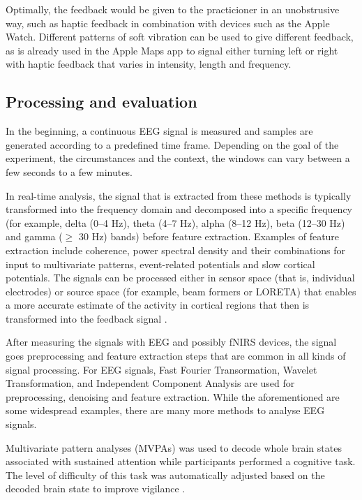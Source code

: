 \documentclass{llncs} %
\begin{document}
Optimally, the feedback would be given to the practicioner in an unobstrusive way, such as haptic feedback in combination with devices such as the Apple Watch. Different patterns of soft vibration can be used to give different feedback, as is already used in the Apple Maps app to signal either turning left or right with haptic feedback that varies in intensity, length and frequency. 

\subsection{Processing and evaluation}

In the beginning, a continuous EEG signal is measured and samples are generated according to a predefined time frame. Depending on the goal of the experiment, the circumstances and the context, the windows can vary between a few seconds to a few minutes. 
\medskip

In real-time analysis, the signal that is extracted from these methods is typically transformed into the frequency domain and decomposed into a specific frequency (for example, delta (0–4 Hz), theta (4–7 Hz), alpha (8–12 Hz), beta (12–30 Hz) and gamma ($\geq$ 30 Hz) bands) before feature extraction. Examples of feature extraction include coherence, power spectral density and their combinations for input to multivariate patterns, event-related potentials and slow cortical potentials. The signals can be processed either in sensor space (that is, individual electrodes) or source space (for example, beam formers or LORETA) that enables a more accurate estimate of the activity in cortical regions that then is transformed into the feedback signal \cite{Sitaram}.
\medskip

After measuring the signals with EEG and possibly fNIRS devices, the signal goes preprocessing and feature extraction steps that are common in all kinds of signal processing. For EEG signals, Fast Fourier Transormation, Wavelet Transformation, and Independent Component Analysis are used for preprocessing, denoising and feature extraction. While the aforementioned are some widespread examples, there are many more methods to analyse EEG signals.
\medskip

Multivariate pattern analyses (MVPAs) was used to decode whole brain states associated with sustained attention while participants performed a cognitive task. The level of difficulty of this task was automatically adjusted based on the decoded brain state to improve vigilance \cite{Sitaram}.
\medskip
\end{document}
